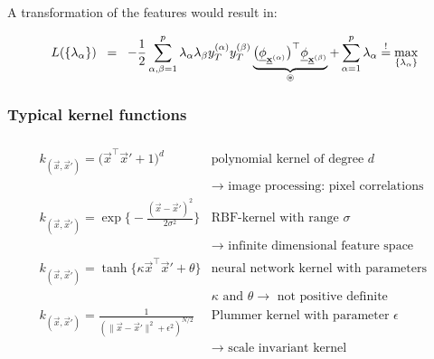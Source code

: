 \begin{frame}
A transformation of the features would result in:

\slidesonly{\vspace{-3mm}}
\begin{equation} 
    L(\{\lambda_\alpha\})
        \;\;=\;\;  -\frac{1}{2} \sum\limits_{\alpha, \beta = 1}^p 
        \lambda_\alpha \lambda_\beta y_T^{(\alpha)}
        y_T^{(\beta)} 
        \underbrace{\big( \underline{\mathbf{\phi}}_{\underline{\mathbf{x}}^{(\alpha)}} \big)^\top 
            \underline{\mathbf{\phi}}_{\underline{\mathbf{x}}^{(\beta)}}}_{ \circledast }
        + \sum\limits_{\alpha = 1}^p \lambda_\alpha{}
        \stackrel{\mathrm{!}}{=} \max_{\{\lambda_\alpha\}}
\end{equation}
    
\end{frame}

\subsubsection{Typical kernel functions}

\begin{frame}\frametitle{\subsubsecname}
	\[ \begin{array}{ll}
		k_{(\vec{x}, \vec{x}')} = \big( \vec{x}^\top \vec{x}' + 1 \big)^d
		& \text{polynomial kernel of degree } d\\ 
		& \rightarrow \text{ image processing: pixel correlations} \\[4mm]
		k_{(\vec{x}, \vec{x}')} = \exp \Big\{ -\frac{(\vec{x} - \vec{x}')^2}{
			2 \sigma^2} \Big\}
		& \text{RBF-kernel with range } \sigma \\[-1mm]  
		& \rightarrow \text{ infinite dimensional feature space} \\[4mm]
		k_{(\vec{x}, \vec{x}')} = \tanh \big\{ \kappa \vec{x}^\top \vec{x}' + \theta
			\big\}
		& \text{neural network kernel with parameters } \\ 
		&	\kappa \text{ and } \theta 
			\rightarrow \text{ not positive definite} \\[4mm]
		k_{(\vec{x}, \vec{x}')} = \frac{1}{ (\|\vec{x} - \vec{x}'\|^2 
			+ \epsilon^2 )^{N/2}}
		& \text{Plummer kernel with parameter } \epsilon \\[-1mm]
		& \rightarrow \text{ scale invariant kernel}
	\end{array} \]
\end{frame}

